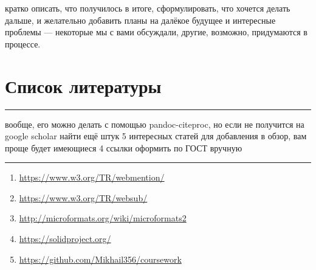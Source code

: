 кратко описать, что получилось в итоге, сформулировать, что хочется
делать дальше, и желательно добавить планы на далёкое будущее и
интересные проблемы --- некоторые мы с вами обсуждали, другие, возможно,
придумаются в процессе.

\hypertarget{ux441ux43fux438ux441ux43eux43a-ux43bux438ux442ux435ux440ux430ux442ux443ux440ux44b}{%
\section{Список
литературы}\label{ux441ux43fux438ux441ux43eux43a-ux43bux438ux442ux435ux440ux430ux442ux443ux440ux44b}}

\begin{center}\rule{0.5\linewidth}{0.5pt}\end{center}

вообще, его можно делать с помощью pandoc-citeproc, но если не получится
на google scholar найти ещё штук 5 интересных статей для добавления в
обзор, вам проще будет имеющиеся 4 ссылки оформить по ГОСТ вручную

\begin{center}\rule{0.5\linewidth}{0.5pt}\end{center}

\begin{enumerate}
\def\labelenumi{\arabic{enumi}.}
\tightlist
\item
  \url{https://www.w3.org/TR/webmention/}
\item
  \url{https://www.w3.org/TR/websub/}
\item
  \url{http://microformats.org/wiki/microformats2}
\item
  \url{https://solidproject.org/}
\item
  \url{https://github.com/Mikhail356/coursework}
\end{enumerate}
